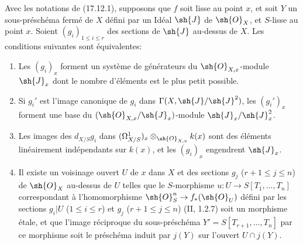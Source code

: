\begin{corollary}[17.12.2]
\label{IV.17.12.2}
Avec les notations de (17.12.1), supposons que $f$ soit lisse au point $x$, et soit $Y$ un sous-préschéma fermé de $X$ défini par un Idéal $\sh{J}$ de $\sh{O}_X$, et $S$-lisse au point $x$. Soient $(g_i)_{1\leq i\leq r}$ des sections de $\sh{J}$ au-dessus de $X$. Les conditions suivantes sont équivalentes:
\begin{enumerate}
  \item[a)] Les $(g_i)_x$ forment un système de générateurs du $\sh{O}_{X,x}$-module $\sh{J}_x$ dont le nombre d'éléments est le plus petit possible.
  \item[b)] Si $g_i'$ est l'image canonique de $g_i$ dans $\Gamma(X,\sh{J}/\sh{J}^2)$, les $(g_i')_x$ forment une base du $(\sh{O}_{X,x}/\sh{J}_x)$-module $\sh{J}_x/\sh{J}_x^2$.


  \item[c)] Les images des $d_{X/S}g_i$ dans $(\Omega^1_{X/S})_x\otimes_{\sh{O}_{X,x}}k(x)$ sont des éléments linéairement indépendants sur $k(x)$, et les $(g_i)_x$ engendrent $\sh{J}_x$.
  \item[d)] Il existe un voisinage ouvert $U$ de $x$ dans $X$ et des sections $g_j$ ($r+1\leq j\leq n$) de $\sh{O}_X$ au-dessus de $U$ telles que le $S$-morphisme $u:U\to S[T_1,\ldots,T_n]$ correspondant à l'homomorphisme $\sh{O}_S^n\to f_*(\sh{O}_U)$ défini par les sections $g_i|U$ ($1\leq i\leq r$) et $g_j$ ($r+1\leq j\leq n$) (II, 1.2.7) soit un morphisme étale, et que l'image réciproque du sous-préschéma $Y'=S[T_{r+1},\ldots,T_n]$ par ce morphisme soit le préschéma induit par $j(Y)$ sur l'ouvert $U\cap j(Y)$.
\end{enumerate}
\end{corollary}

